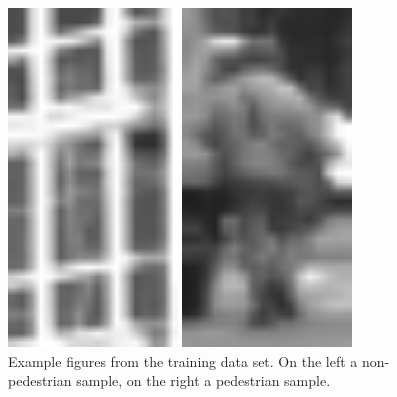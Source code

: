 \documentclass[journal,twocolumn]{IEEEtran}
\begin{document}
\begin{figure}[h]
\begin{minipage}{0.45\columnwidth}
\centering
\includegraphics[keepaspectratio,width=0.4\textwidth]{1}
\end{minipage}
\begin{minipage}{0.45\columnwidth}
\centering
\includegraphics[keepaspectratio,width=0.4\textwidth]{2}
\end{minipage}
\caption{Example figures from the training data set. On the left a non-pedestrian sample, on the right a pedestrian sample.}
\end{figure}
\end{document}

